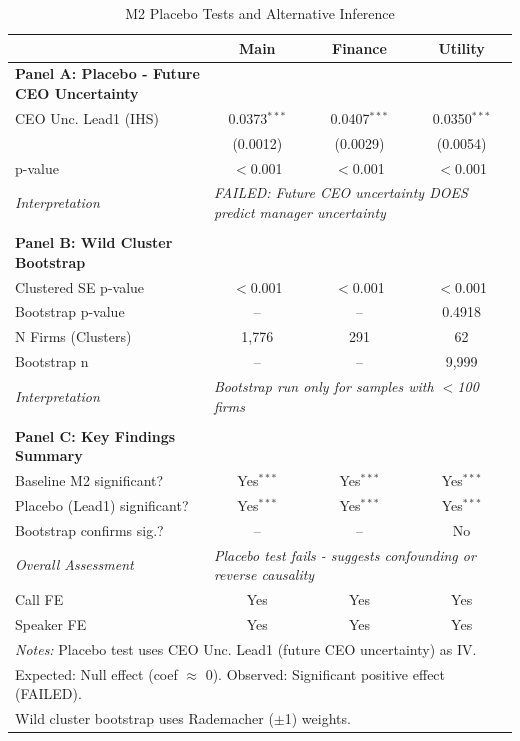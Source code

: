 \documentclass[11pt]{article}
\begin{document}
\begin{table}[htbp]
\centering
\caption{M2 Placebo Tests and Alternative Inference}
\label{tab:placebo}
\footnotesize
\setlength{\tabcolsep}{6pt}
\begin{tabular}{lccc}
\toprule
 & Main & Finance & Utility \\
\midrule
\textbf{Panel A: Placebo - Future CEO Uncertainty} \\
CEO Unc. Lead1 (IHS) & 0.0373$^{***}$ & 0.0407$^{***}$ & 0.0350$^{***}$ \\
 & (0.0012) & (0.0029) & (0.0054) \\
p-value & $<$0.001 & $<$0.001 & $<$0.001 \\
\textit{Interpretation} & \multicolumn{3}{l}{\textit{FAILED: Future CEO uncertainty DOES predict manager uncertainty}} \\
 &  &  & \\
\textbf{Panel B: Wild Cluster Bootstrap} \\
Clustered SE p-value & $<$0.001 & $<$0.001 & $<$0.001 \\
Bootstrap p-value & -- & -- & 0.4918 \\
N Firms (Clusters) & 1,776 & 291 & 62 \\
Bootstrap n & -- & -- & 9,999 \\
\textit{Interpretation} & \multicolumn{3}{l}{\textit{Bootstrap run only for samples with $<$100 firms}} \\
 &  &  & \\
\textbf{Panel C: Key Findings Summary} \\
Baseline M2 significant? & Yes$^{***}$ & Yes$^{***}$ & Yes$^{***}$ \\
Placebo (Lead1) significant? & Yes$^{***}$ & Yes$^{***}$ & Yes$^{***}$ \\
Bootstrap confirms sig.? & -- & -- & No \\
\textit{Overall Assessment} & \multicolumn{3}{l}{\textit{Placebo test fails - suggests confounding or reverse causality}} \\
\midrule
Call FE & Yes & Yes & Yes \\
Speaker FE & Yes & Yes & Yes \\
\bottomrule
\multicolumn{4}{l}{\parbox{\linewidth}{\footnotesize \textit{Notes:} Placebo test uses CEO Unc. Lead1 (future CEO uncertainty) as IV.}} \\
\multicolumn{4}{l}{\parbox{\linewidth}{\footnotesize Expected: Null effect (coef $\approx$ 0). Observed: Significant positive effect (FAILED).}} \\
\multicolumn{4}{l}{\parbox{\linewidth}{\footnotesize Wild cluster bootstrap uses Rademacher ($\pm$1) weights.}} \\
\end{tabular}
\end{table}
\end{document}
